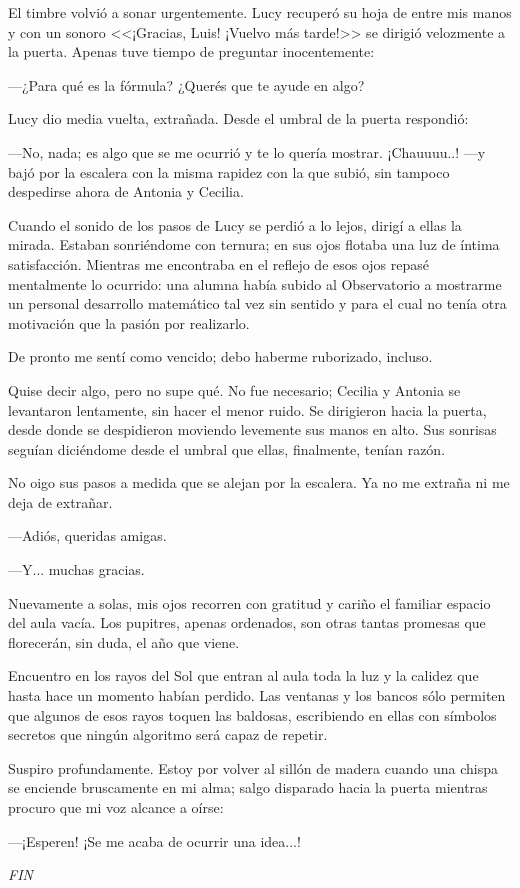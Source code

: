 El timbre volvió a sonar urgentemente. Lucy recuperó su hoja de entre
mis manos y con un sonoro <<¡Gracias, Luis! ¡Vuelvo más tarde!>> se
dirigió velozmente a la puerta. Apenas tuve tiempo de preguntar
inocentemente:

---¿Para qué es la fórmula? ¿Querés que te ayude en algo?

Lucy dio media vuelta, extrañada. Desde el umbral de la puerta
respondió:

---No, nada; es algo que se me ocurrió y te lo quería
mostrar. ¡Chauuuu..! ---y bajó por la escalera con la misma rapidez
con la que subió, sin tampoco despedirse ahora de Antonia y Cecilia.

Cuando el sonido de los pasos de Lucy se perdió a lo lejos, dirigí a
ellas la mirada. Estaban sonriéndome con ternura; en sus ojos flotaba
una luz de íntima satisfacción. Mientras me encontraba en el reflejo
de esos ojos repasé mentalmente lo ocurrido: una alumna había subido
al Observatorio a mostrarme un personal desarrollo matemático tal vez
sin sentido y para el cual no tenía otra motivación que la pasión por
realizarlo.

De pronto me sentí como vencido; debo haberme ruborizado, incluso.

Quise decir algo, pero no supe qué. No fue necesario; Cecilia y
Antonia se levantaron lentamente, sin hacer el menor ruido. Se
dirigieron hacia la puerta, desde donde se despidieron moviendo
levemente sus manos en alto. Sus sonrisas seguían diciéndome desde el
umbral que ellas, finalmente, tenían razón.

No oigo sus pasos a medida que se alejan por la escalera. Ya no me
extraña ni me deja de extrañar.

---Adiós, queridas amigas.

---Y... muchas gracias.

Nuevamente a solas, mis ojos recorren con gratitud y cariño el
familiar espacio del aula vacía. Los pupitres, apenas ordenados, son
otras tantas promesas que florecerán, sin duda, el año que viene.

Encuentro en los rayos del Sol que entran al aula toda la luz y la
calidez que hasta hace un momento habían perdido. Las ventanas y los
bancos sólo permiten que algunos de esos rayos toquen las baldosas,
escribiendo en ellas con símbolos secretos que ningún algoritmo será
capaz de repetir.

Suspiro profundamente. Estoy por volver al sillón de madera cuando una
chispa se enciende bruscamente en mi alma; salgo disparado hacia la
puerta mientras procuro que mi voz alcance a oírse:

---¡Esperen! ¡Se me acaba de ocurrir una idea...!


\vfill

\begin{center}
  \emph{FIN}
\end{center}

\vfill

